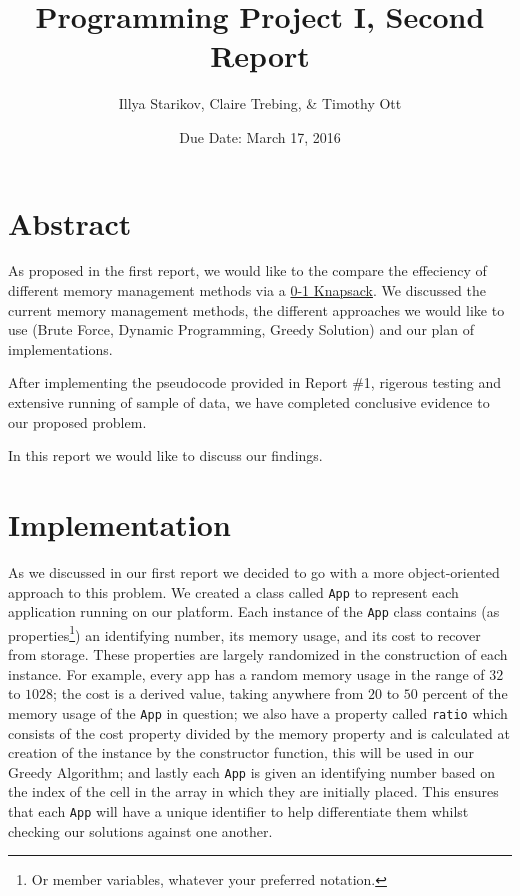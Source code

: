 \documentclass{article}
\title{Programming Project I, Second Report}
\author{Illya Starikov, Claire Trebing, \& Timothy Ott}
\date{Due Date: March 17, 2016}
\newcommand{\ignore}[1]{}
\begin{document}
\maketitle

\section{Abstract}
As proposed in the first report, we would like to the compare the effeciency of different memory management methods via a \href{https://en.wikipedia.org/wiki/Knapsack_problem#0.2F1_knapsack_problem}{0-1 Knapsack}. We discussed the current memory management methods, the different approaches we would like to use (Brute Force, Dynamic Programming, Greedy Solution) and our plan of implementations.

After implementing the pseudocode provided in Report \#1, rigerous testing and extensive running of sample of data, we have completed conclusive evidence to our proposed problem.

In this report we would like to discuss our findings.

\section{Implementation}
As we discussed in our first report we decided to go with a more object-oriented approach to this problem. We created a class called \texttt{App} to represent each application running on our platform. Each instance of the \texttt{App} class contains (as properties\footnote{Or member variables, whatever your preferred notation.}) an identifying number, its memory usage, and its cost to recover from storage. These properties are largely randomized in the construction of each instance. For example, every app has a random memory usage in the range of $32$ to $1028$; the cost is a derived value, taking anywhere from $20$ to $50$ percent of the memory usage of the \texttt{App} in question; we also have a property called \texttt{ratio} which consists of the cost property divided by the memory property and is calculated at creation of the instance by the constructor function, this will be used in our Greedy Algorithm; and lastly each \texttt{App} is given an identifying number based on the index of the cell in the array in which they are initially placed. This ensures that each \texttt{App} will have a unique identifier to help differentiate them whilst\ignore{Sorry, couldn't resist swapping out while for whilst!} checking our solutions against one another.
\end{document}
